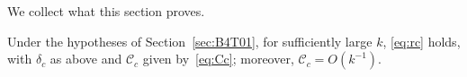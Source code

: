 We collect what this section proves.
\begin{lemasub}\label{lem:escalar}
Under the hypotheses of Section~\ref{sec:B4T01}, for sufficiently large $k$, \eqref{eq:rc} holds,
with $\delta_c$ as above and $\mathcal C_c$ given by~\eqref{eq:Cc}; moreover, $\mathcal C_c=O(k^{-1})$.
\end{lemasub}
